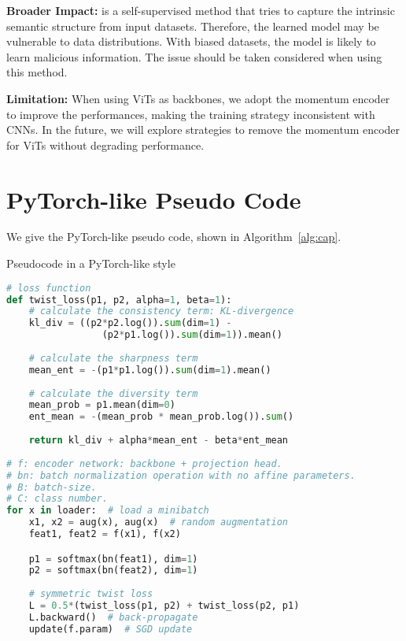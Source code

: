 \documentclass[10pt,twocolumn,letterpaper]{article}
\begin{document}
\textbf{Broader Impact:} \ourmethod is a self-supervised method that tries to capture the intrinsic semantic structure from input datasets. Therefore, the learned model may be vulnerable to data distributions. With biased datasets, the model is likely to learn malicious information. The issue should be taken considered when using this method.

\textbf{Limitation:} When using ViTs as backbones, we adopt the momentum encoder to improve the performances, making the training strategy inconsistent with CNNs. In the future, we will explore strategies to remove the momentum encoder for ViTs without degrading performance.

{\small


}
\newpage
\appendix

\section{PyTorch-like Pseudo Code}
We give the PyTorch-like pseudo code, shown in Algorithm~\ref{alg:cap}.
\begin{algorithm}[h]
\caption{\ourmethod Pseudocode in a PyTorch-like style}
\label{alg:cap}
\vspace{-0.2cm}
\begin{lstlisting}[language=python]
# loss function
def twist_loss(p1, p2, alpha=1, beta=1):
    # calculate the consistency term: KL-divergence
    kl_div = ((p2*p2.log()).sum(dim=1) - 
                 (p2*p1.log()).sum(dim=1)).mean()
                 
    # calculate the sharpness term
    mean_ent = -(p1*p1.log()).sum(dim=1).mean()
    
    # calculate the diversity term
    mean_prob = p1.mean(dim=0)
    ent_mean = -(mean_prob * mean_prob.log()).sum()
    
    return kl_div + alpha*mean_ent - beta*ent_mean
    
# f: encoder network: backbone + projection head.
# bn: batch normalization operation with no affine parameters.
# B: batch-size.
# C: class number.
for x in loader:  # load a minibatch
    x1, x2 = aug(x), aug(x)  # random augmentation
    feat1, feat2 = f(x1), f(x2)

    p1 = softmax(bn(feat1), dim=1)
    p2 = softmax(bn(feat2), dim=1)
    
    # symmetric twist loss
    L = 0.5*(twist_loss(p1, p2) + twist_loss(p2, p1)
    L.backward()  # back-propagate
    update(f.param)  # SGD update
\end{lstlisting}
\end{algorithm}
\end{document}
